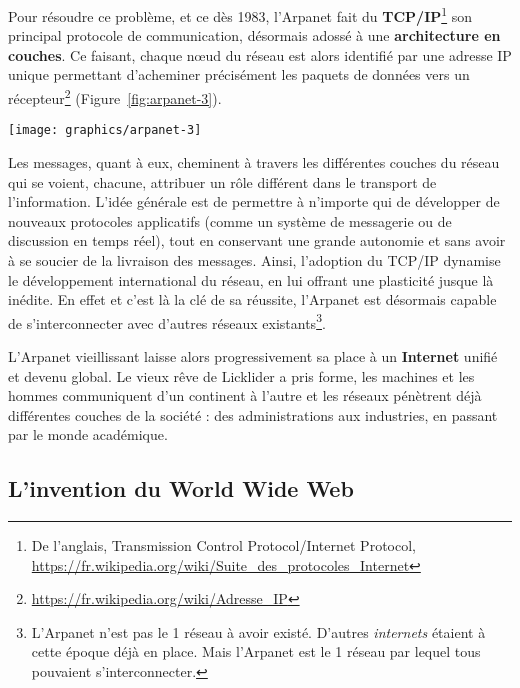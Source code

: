 \documentclass[symmetric,justified,marginals=raggedouter]{tufte-book}
\begin{document}
Pour résoudre ce problème, et ce dès 1983, l'Arpanet fait du \textbf{TCP/IP}\footnote{\RaggedOuter De l'anglais, Transmission Control Protocol/Internet Protocol, \url{https://fr.wikipedia.org/wiki/Suite\_des\_protocoles\_Internet}} son principal protocole de communication, désormais adossé à une \textbf{architecture en couches}. Ce faisant, chaque nœud du réseau est alors identifié par une adresse IP unique permettant d'acheminer précisément les paquets de données vers un récepteur\footnote{\RaggedOuter \url{https://fr.wikipedia.org/wiki/Adresse\_IP}} (Figure~\ref{fig:arpanet-3}).  

\begin{figure*}
  \texttt{[image: graphics/arpanet-3]}
  \caption{Cheminement d'un message à travers un réseau de type Arpanet, suivant le protocole TCP/IP}
  \label{fig:arpanet-3}
\end{figure*} 

\noindent Les messages, quant à eux, cheminent à travers les différentes cou\-ches du réseau qui se voient, chacune, attribuer un rôle différent dans le transport de l'information. L'idée générale est de permettre à n'importe qui de développer de nouveaux protocoles applicatifs (com\-me un système de messagerie ou de discussion en temps réel), tout en conservant une grande autonomie et sans avoir à se soucier de la livraison des messages. Ainsi, l'adoption du TCP/IP dynamise le développement international du réseau, en lui offrant une plasticité jusque là inédite. En effet et c'est là la clé de sa réussite, l'Arpanet est désormais capable de s'interconnecter avec d'autres réseaux existants\footnote{L'Arpanet n'est pas le 1\ier{} réseau à avoir existé. D'autres \textit{internets} étaient à cette époque déjà en place. Mais l'Arpanet est le 1\ier{} réseau par lequel tous pouvaient s'interconnecter.}. 

L'Arpanet vieillissant laisse alors progressivement sa place à un \textbf{Internet} unifié et devenu global. Le vieux rêve de Licklider a pris forme, les machines et les hommes communiquent d'un continent à l'autre et les réseaux pénètrent déjà différentes couches de la société : des administrations aux industries, en passant par le monde académique. \\

\subsection{L'invention du World Wide Web} 
\end{document}
